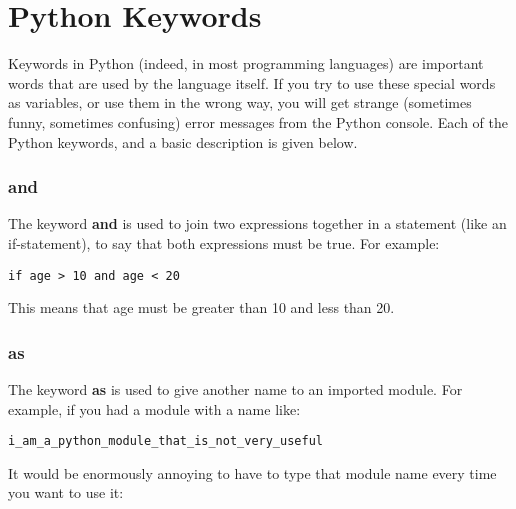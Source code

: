 

\chapter{Python Keywords}\label{app:pythonkeywords}

Keywords in Python (indeed, in most programming languages) are important words that are used by the language itself. If you try to use these special words as variables, or use them in the wrong way, you will get strange (sometimes funny, sometimes confusing) error messages from the Python console.  Each of the Python keywords, and a basic description is given below.

\subsection*{and}

The keyword \textbf{and} is used to join two expressions together in a statement (like an if-statement), to say that both expressions must be true.  For example:

\begin{Verbatim}[frame=single]
if age > 10 and age < 20
\end{Verbatim}

\noindent
This means that age must be greater than 10 and less than 20.

\subsection*{as}

The keyword \textbf{as} is used to give another name to an imported module. For example, if you had a module with a name like:

\begin{Verbatim}[frame=single]
i_am_a_python_module_that_is_not_very_useful
\end{Verbatim}

\noindent
It would be enormously annoying to have to type that module name every time you want to use it:

